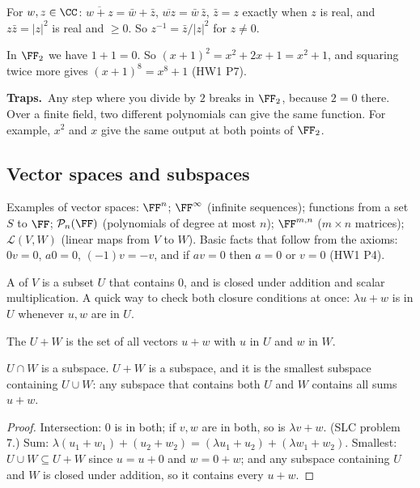\documentclass[11pt]{scrartcl}
\newcommand{\LL}{\mathcal L}
\newcommand{\PP}{\mathcal P}
\newcommand{\traps}{\par\medskip\noindent\textbf{\color{RawSienna}Traps.}\ }
\begin{document}
\begin{proposition*}
  For $w,z\in\CC$: $\overline{w+z}=\bar w+\bar z$, $\overline{wz}=\bar w\,\bar z$, $\bar z=z$ exactly when $z$ is real, and $z\bar z=|z|^2$ is real and $\ge0$.
  So $z^{-1}=\bar z/|z|^2$ for $z\ne0$.
\end{proposition*}

In $\FF_2$ we have $1+1=0$. So $(x+1)^2=x^2+2x+1=x^2+1$, and squaring twice more gives $(x+1)^8=x^8+1$ (HW1 P7).

\traps Any step where you divide by $2$ breaks in $\FF_2$, because $2=0$ there.
Over a finite field, two different polynomials can give the same function. For example, $x^2$ and $x$ give the same output at both points of $\FF_2$.

\subsection{Vector spaces and subspaces}
Examples of vector spaces: $\FF^n$; $\FF^\infty$ (infinite sequences); functions from a set $S$ to $\FF$; $\PP_n(\FF)$ (polynomials of degree at most $n$); $\FF^{m,n}$ ($m\times n$ matrices); $\LL(V,W)$ (linear maps from $V$ to $W$).
Basic facts that follow from the axioms: $0v=0$, $a0=0$, $(-1)v=-v$, and if $av=0$ then $a=0$ or $v=0$ (HW1 P4).

\begin{definition*}
  A  of $V$ is a subset $U$ that contains $0$, and is closed under addition and scalar multiplication.
  A quick way to check both closure conditions at once: $\lambda u+w$ is in $U$ whenever $u,w$ are in $U$.

  The  $U+W$ is the set of all vectors $u+w$ with $u$ in $U$ and $w$ in $W$.
\end{definition*}

\begin{proposition*}[Prop.~5, 6]
  $U\cap W$ is a subspace. $U+W$ is a subspace, and it is the smallest subspace containing $U\cup W$: any subspace that contains both $U$ and $W$ contains all sums $u+w$.
\end{proposition*}
\begin{proof}
  Intersection: $0$ is in both; if $v,w$ are in both, so is $\lambda v+w$. (SLC problem 7.)
  Sum: $\lambda(u_1+w_1)+(u_2+w_2)=(\lambda u_1+u_2)+(\lambda w_1+w_2)$.
  Smallest: $U\cup W\subseteq U+W$ since $u=u+0$ and $w=0+w$; and any subspace containing $U$ and $W$ is closed under addition, so it contains every $u+w$.
\end{proof}
\end{document}
